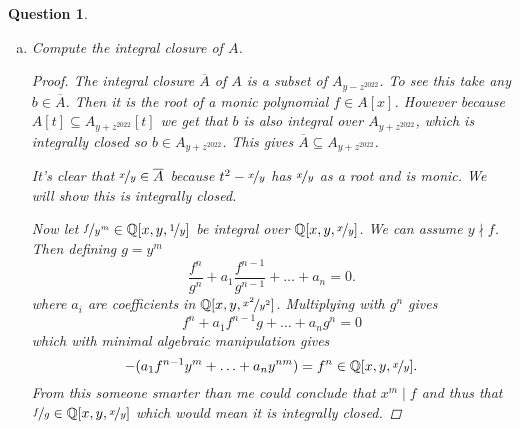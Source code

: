 \documentclass{article}
\newcommand{\Q}{\mathbb{Q}}
\newtheorem{question}{Question}
\theoremstyle{definition}
\begin{document}
\begin{question}
\begin{enumerate}[(a)]
        \item Compute the integral closure of \(A\).

              \begin{proof}
                  The integral closure \(\overline{A}\) of \(A\) is a subset of
                  \(A_{y-z^{2022}}\). To see this take any \(b\in\overline{A}\).
                  Then it is the root of a monic polynomial \(f\in A[x]\).
                  However because \(A[t]\subseteq A_{y+z^{2022}}[t]\) we get
                  that \(b\) is also integral over \(A_{y+z^{2022}}\), which is
                  integrally closed so \(b\in A_{y+z^{2022}}\). This gives
                  \(\overline{A}\subseteq A_{y+z^{2022}}\).

                  It's clear that \(\nicefrac{x}{y}\in\overline{A}\) because
                  \(t^{2}-\nicefrac{x}{y}\) has \(\nicefrac{x}{y}\) as a root
                  and is monic. We will show this is integrally closed.

                  Now let \(\nicefrac{f}{y^{m}}\in \Q[x,y,\nicefrac{1}{y}]\) be
                  integral over \(\Q[x,y,\nicefrac{x}y]\). We can assume
                  \(y\nmid f\). Then defining \(g=y^{m}\)
                  \[
                      \frac{f^{n}}{g^{n}}+a_{1}\frac{f^{n-1}}{g^{n-1}}+\ldots+a_{n}=0.
                  \]
                  where \(a_{i}\) are coefficients in
                  \(\Q[x,y,\nicefrac{x^{2}}{y^{2}}]\). Multiplying with
                  \(g^{n}\) gives
                  \[
                      f^{n}+a_{1}f^{n-1}g+\ldots+a_{n}g^{n}=0
                  \]
                  which with minimal algebraic manipulation gives
                  \[
                      -(a_{1}f^{n-1}y^{m}+\ldots+a_{n}y^{nm})=f^{n}\in\Q[x,y,\nicefrac{x}{y}].
                  \]
                  From this someone smarter than me could conclude that
                  \(x^{m}\mid f\) and thus that
                  \(\nicefrac{f}{g}\in\Q[x,y,\nicefrac{x}{y}]\) which would mean
                  it is integrally closed.
              \end{proof}
    \end{enumerate}
\end{question}
\end{document}
